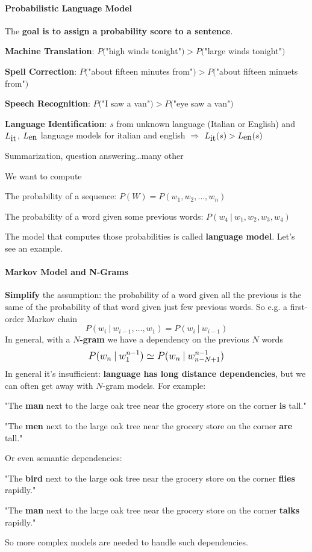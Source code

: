 \documentclass[10pt]{report}
\begin{document}
\paragraph{Probabilistic Language Model} The \textbf{goal is to assign a probability score to a sentence}.
\begin{list}{}{Applications:}
	\item \textbf{Machine Translation}: $P($"high winds tonight"$) > P($"large winds tonight"$)$
	\item \textbf{Spell Correction}: $P($"about fifteen minutes from"$) > P($"about fifteen minuets from"$)$
	\item \textbf{Speech Recognition}: $P($"I saw a van"$) > P($"eye saw a van"$)$
	\item \textbf{Language Identification}: $s$ from unknown language (Italian or English) and $L_{\hbox{it}}$, $L_{\hbox{en}}$ language models for italian and english $\Rightarrow$ $L_{\hbox{it}}(s) > L_{\hbox{en}}(s)$
	\item Summarization, question answering\ldots many other
\end{list}
We want to compute \begin{list}{}{}
	\item The probability of a sequence: $P(W) = P(w_1,w_2,\ldots,w_n)$
	\item The probability of a word given some previous words: $P(w_4\:|\:w_1,w_2,w_3,w_4)$
\end{list}
The model that computes those probabilities is called \textbf{language model}. Let's see an example.
\paragraph{Markov Model and N-Grams} \textbf{Simplify} the assumption: the probability of a word given all the previous is the same of the probability of that word given just few previous words. So e.g. a first-order Markov chain $$P(w_i\:|\:w_{i-1},\ldots,w_1) = P(w_i\:|\:w_{i-1})$$
In general, with a \textbf{$N$-gram} we have a dependency on the previous $N$ words $$\mathlarger{P(w_n\:|\:w_1^{n-1}) \simeq P(w_n\:|\:w_{n-N+1}^{n-1})}$$
In general it's insufficient: \textbf{language has long distance dependencies}, but we can often get away with $N$-gram models. For example:\begin{list}{}{}
	\item "The \textbf{man} next to the large oak tree near the grocery store on the corner \textbf{is} tall."
	\item "The \textbf{men} next to the large oak tree near the grocery store on the corner \textbf{are} tall."
\end{list}
Or even semantic dependencies:
\begin{list}{}{}
	\item "The \textbf{bird} next to the large oak tree near the grocery store on the corner \textbf{flies} rapidly."
	\item "The \textbf{man} next to the large oak tree near the grocery store on the corner \textbf{talks} rapidly."
\end{list}
So more complex models are needed to handle such dependencies.
\end{document}
